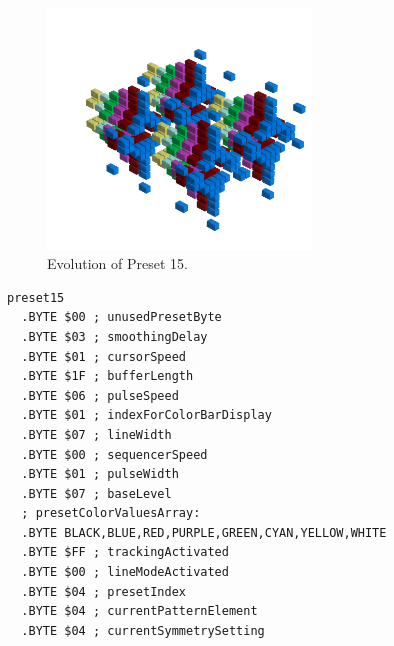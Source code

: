 \clearpage
\begin{minipage}[b]{0.48\linewidth}
\begin{figure}[H]                                                          
  \centering                                                             
  \begin{adjustbox}{width=7cm,center}                                   
  \includegraphics[width=7cm]{src/presets/pattern15-45.png}%
  \end{adjustbox}                                                        
\caption{Evolution of Preset 15.}                                           
\end{figure}                                                               
                                                                 
                                                                           
\end{minipage}
\hspace{0.1cm}
\begin{minipage}[b]{0.48\linewidth}                                       
\begin{lstlisting}[basicstyle=\ttfamily\scriptsize,caption=Data structure for Preset 15.]
preset15
  .BYTE $00 ; unusedPresetByte
  .BYTE $03 ; smoothingDelay
  .BYTE $01 ; cursorSpeed
  .BYTE $1F ; bufferLength
  .BYTE $06 ; pulseSpeed
  .BYTE $01 ; indexForColorBarDisplay
  .BYTE $07 ; lineWidth
  .BYTE $00 ; sequencerSpeed
  .BYTE $01 ; pulseWidth
  .BYTE $07 ; baseLevel
  ; presetColorValuesArray: 
  .BYTE BLACK,BLUE,RED,PURPLE,GREEN,CYAN,YELLOW,WHITE
  .BYTE $FF ; trackingActivated
  .BYTE $00 ; lineModeActivated
  .BYTE $04 ; presetIndex
  .BYTE $04 ; currentPatternElement
  .BYTE $04 ; currentSymmetrySetting
\end{lstlisting}
\end{minipage}


